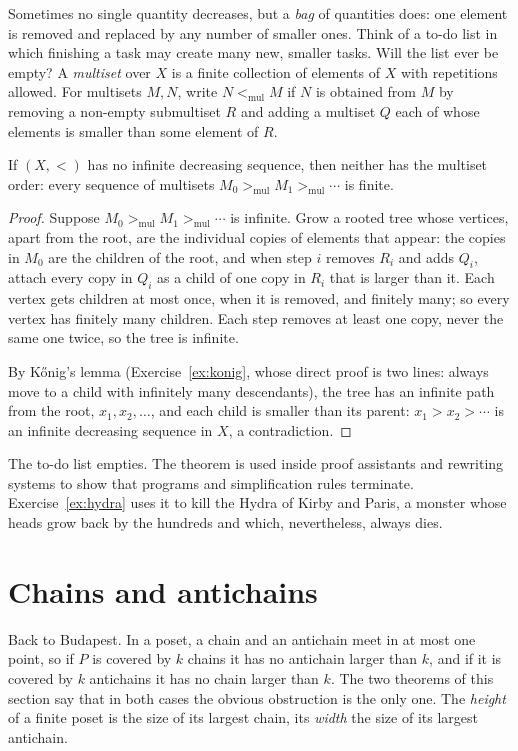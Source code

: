Sometimes no single quantity decreases, but a \emph{bag} of quantities does: one element is removed and replaced by any
number of smaller ones. Think of a to-do list in which finishing a task may create many new, smaller tasks. Will the list
ever be empty? A \emph{multiset} over $X$ is a finite collection of elements of $X$ with repetitions allowed. For multisets $M,N$, write
$N<_{\mathrm{mul}}M$ if $N$ is obtained from $M$ by removing a non-empty submultiset $R$ and adding a multiset $Q$ each of whose elements is
smaller than some element of $R$.

\begin{theorem}\label{thm:multiset}
If $(X,<)$ has no infinite decreasing sequence, then neither has the multiset order: every sequence of multisets
$M_0>_{\mathrm{mul}}M_1>_{\mathrm{mul}}\cdots$ is finite.
\end{theorem}
\begin{proof}
Suppose $M_0>_{\mathrm{mul}}M_1>_{\mathrm{mul}}\cdots$ is infinite. Grow a rooted tree whose vertices, apart from the root, are the individual copies of
elements that appear: the copies in $M_0$ are the children of the root, and when step $i$ removes $R_i$ and adds $Q_i$, attach every
copy in $Q_i$ as a child of one copy in $R_i$ that is larger than it. Each vertex gets children at most once, when it is
removed, and finitely many; so every vertex has finitely many children. Each step removes at least one copy, never
the same one twice, so the tree is infinite.

By K\H onig's lemma (Exercise~\ref{ex:konig}, whose direct proof is two lines: always move to a child with infinitely many
descendants), the tree has an infinite path from the root, $x_1,x_2,\dots$, and each child is smaller than its parent:
$x_1>x_2>\cdots$ is an infinite decreasing sequence in $X$, a contradiction.
\end{proof}

The to-do list empties. The theorem is used inside proof assistants and rewriting systems to show that programs and
simplification rules terminate. Exercise~\ref{ex:hydra} uses it to kill the Hydra of Kirby and Paris, a monster whose
heads grow back by the hundreds and which, nevertheless, always dies.

\section{Chains and antichains}

Back to Budapest. In a poset, a chain and an antichain meet in at most one point, so if $P$ is covered by $k$ chains it has
no antichain larger than $k$, and if it is covered by $k$ antichains it has no chain larger than $k$. The two theorems of this
section say that in both cases the obvious obstruction is the only one. The \emph{height} of a finite poset is the size of
its largest chain, its \emph{width} the size of its largest antichain.

